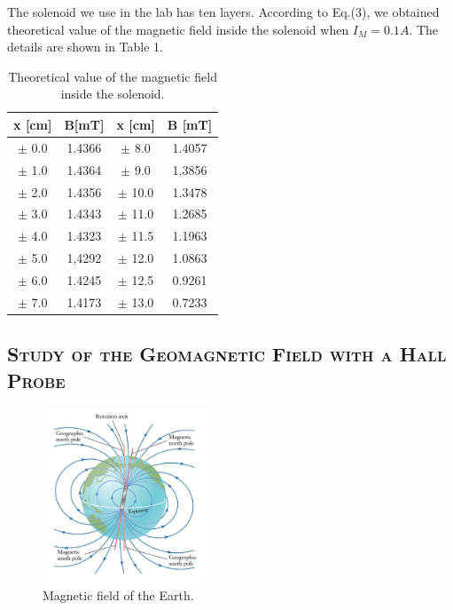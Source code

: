 \documentclass[a4paper,12pt]{article}
\begin{document}
The solenoid we use in the lab has ten layers. According to Eq.(3), we obtained theoretical value of the magnetic field inside the solenoid when $I_M = 0.1A$. The details are shown in Table 1.

\begin{table}[H]
\begin{center}
\begin{tabular}{|c|c||c|c|}
\hline
x {[}cm{]} & B{[}mT{]} & x {[}cm{]} & B {[}mT{]} \\ \hline
$\pm$ 0.0 & 1.4366 & $\pm$ 8.0 & 1.4057 \\ \hline
$\pm$ 1.0 & 1.4364 & $\pm$ 9.0 & 1.3856 \\ \hline
$\pm$ 2.0 & 1.4356 & $\pm$ 10.0 & 1.3478 \\ \hline
$\pm$ 3.0 & 1.4343 & $\pm$ 11.0 & 1.2685 \\ \hline
$\pm$ 4.0 & 1.4323 & $\pm$ 11.5 & 1.1963 \\ \hline
$\pm$ 5.0 & 1,4292 & $\pm$ 12.0 & 1.0863 \\ \hline
$\pm$ 6.0 & 1.4245 & $\pm$ 12.5 & 0.9261 \\ \hline
$\pm$ 7.0 & 1.4173 & $\pm$ 13.0 & 0.7233 \\ \hline
\end{tabular}
\caption{Theoretical value of the magnetic field inside the solenoid.\cite{labmanual}}
\end{center}
\end{table}

\subsection{\textsc{Study of the Geomagnetic Field with a Hall Probe}}
\begin{figure}[htb] 
    \centering
    \includegraphics[width=0.45\textwidth]{Fig3} 
    \caption{Magnetic field of the Earth.\cite{labmanual}} 
\end{figure}
\end{document}
